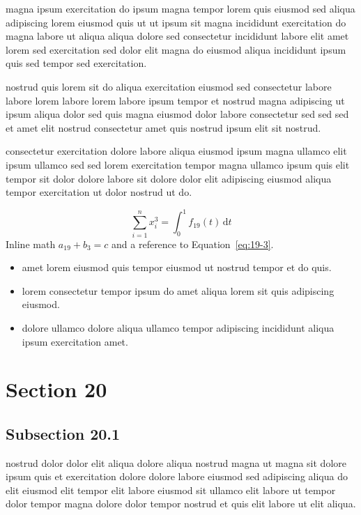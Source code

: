 \documentclass{article}
\begin{document}
magna ipsum exercitation do ipsum magna tempor lorem quis eiusmod sed aliqua adipiscing lorem eiusmod quis ut ut ipsum sit magna incididunt exercitation do magna labore ut aliqua aliqua dolore sed consectetur incididunt labore elit amet lorem sed exercitation sed dolor elit magna do eiusmod aliqua incididunt ipsum quis sed tempor sed exercitation.

nostrud quis lorem sit do aliqua exercitation eiusmod sed consectetur labore labore lorem labore lorem labore ipsum tempor et nostrud magna adipiscing ut ipsum aliqua dolor sed quis magna eiusmod dolor labore consectetur sed sed sed et amet elit nostrud consectetur amet quis nostrud ipsum elit sit nostrud.

consectetur exercitation dolore labore aliqua eiusmod ipsum magna ullamco elit ipsum ullamco sed sed lorem exercitation tempor magna ullamco ipsum quis elit tempor sit dolor dolore labore sit dolore dolor elit adipiscing eiusmod aliqua tempor exercitation ut dolor nostrud ut do.

\begin{equation}\label{eq:19-3}
  \sum_{i=1}^{n} x_i^{3} = \int_0^1 f_{19}(t)\,\mathrm{d}t
\end{equation}
Inline math $a_{19} + b_{3} = c$ and a reference to Equation~\eqref{eq:19-3}.

\begin{itemize}
  \item amet lorem eiusmod quis tempor eiusmod ut nostrud tempor et do quis.
  \item lorem consectetur tempor ipsum do amet aliqua lorem sit quis adipiscing eiusmod.
  \item dolore ullamco dolore aliqua ullamco tempor adipiscing incididunt aliqua ipsum exercitation amet.
\end{itemize}

\section{Section 20}\label{sec:20}
\subsection{Subsection 20.1}\label{sec:20-1}
nostrud dolor dolor elit aliqua dolore aliqua nostrud magna ut magna sit dolore ipsum quis et exercitation dolore dolore labore eiusmod sed adipiscing aliqua do elit eiusmod elit tempor elit labore eiusmod sit ullamco elit labore ut tempor dolor tempor magna dolore dolor tempor nostrud et quis elit labore ut elit aliqua.
\end{document}
